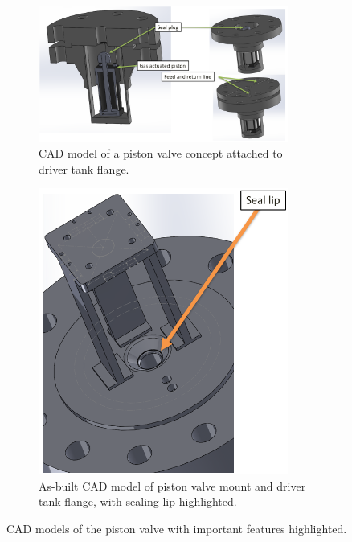 \begin{figure}[htbp]
    \vspace{16pt}
    \centering
    \begin{subfigure}[t]{0.6\textwidth}
        \centering
        \includegraphics[width=0.9\textwidth]{design/photos/PistonValve_Gen1_CAD_labels.PNG}
        \caption{CAD model of a piston valve concept attached to driver tank flange.}
        \label{fig:cad concept}
    \end{subfigure}
    \hfill
    \begin{subfigure}[t]{0.35\textwidth}
        \centering
        \includegraphics[width=0.9\textwidth]{design/photos/PistonMount_CAD_lip.PNG}
        \caption{As-built CAD model of piston valve mount and driver tank flange, with sealing lip highlighted.}
        \label{fig:cad lip}
    \end{subfigure}
    \caption{CAD models of the piston valve with important features highlighted.}
    \label{fig:cad gen 1}
    \vspace{16pt}
\end{figure}

